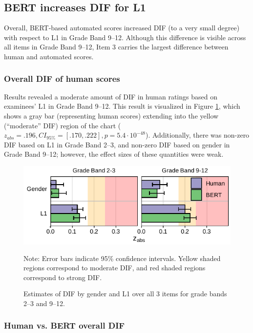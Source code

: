 \documentclass [PhD] {uclathes}
\begin{document}
\subsection{BERT increases DIF for L1}
\label{res_rq1}

Overall, BERT-based automated scores increased DIF (to a very small degree) with respect to L1 in Grade Band 9–12. Although this difference is visible across all items in Grade Band 9–12, Item 3 carries the largest difference between human and automated scores. 

\subsubsection{Overall DIF of human scores}

Results revealed a moderate amount of DIF in human ratings based on examinees’ L1 in Grade Band 9–12. This result is visualized in Figure \ref{fig:zabs_ovr}, which shows a gray bar (representing human scores) extending into the yellow (“moderate” DIF) region of the chart ($z_{abs} = .196, CI_{95\%} = [.170, .222], p = 5.4 \cdot 10^{-48}$). Additionally, there was non-zero DIF based on L1 in Grade Band 2–3, and non-zero DIF based on gender in Grade Band 9–12; however, the effect sizes of these quantities were weak.

\begin{figure}[h]
    \centering
    \caption{Estimates of DIF by gender and L1 over all 3 items for grade bands 2–3 and 9–12.}    
    \includegraphics[width=4.5in]{figures/20230504_ETS-DIF_BERT_zabs_ovr_edit.pdf}
    \label{fig:zabs_ovr}
	{\newline Note: Error bars indicate 95\% confidence intervals. Yellow shaded regions correspond to moderate DIF, and red shaded regions correspond to strong DIF. \par}
\end{figure}

\subsubsection{Human vs. BERT overall DIF}
\end{document}
